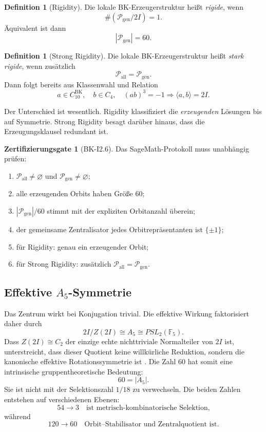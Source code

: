 \documentclass[11pt,a4paper]{article}
\theoremstyle{definition}
\newtheorem{definition}[satz]{Definition}
\newtheorem{gate}[satz]{Zertifizierungsgate}
\newcommand{\twoI}{2I}
\newcommand{\Pgen}{\mathcal P_{\mathrm{gen}}}
\newcommand{\Pall}{\mathcal P_{\mathrm{all}}}
\begin{document}
\begin{definition}[Rigidity]
Die lokale BK-Erzeugerstruktur heißt \emph{rigide}, wenn
\[
\#(\Pgen/\twoI)=1.
\]
Äquivalent ist dann
\[
|\Pgen|=60.
\]
\end{definition}

\begin{definition}[Strong Rigidity]
Die lokale BK-Erzeugerstruktur heißt \emph{stark rigide}, wenn zusätzlich
\[
\Pall=\Pgen.
\]
Dann folgt bereits aus Klassenwahl und Relation
\[
a\in C_{10}^{\mathrm{BK}},\quad
b\in C_4,\quad
(ab)^3=-1
\Longrightarrow
\langle a,b\rangle=\twoI.
\]
\end{definition}

Der Unterschied ist wesentlich. Rigidity klassifiziert die \emph{erzeugenden} Lösungen bis auf Symmetrie. Strong Rigidity besagt darüber hinaus, dass die Erzeugungsklausel redundant ist.

\begin{gate}[BK-I2.6]
Das SageMath-Protokoll muss unabhängig prüfen:
\begin{enumerate}
\item \(\Pall\neq\varnothing\) und \(\Pgen\neq\varnothing\);
\item alle erzeugenden Orbits haben Größe \(60\);
\item \(|\Pgen|/60\) stimmt mit der expliziten Orbitanzahl überein;
\item der gemeinsame Zentralisator jedes Orbitrepräsentanten ist \(\{\pm1\}\);
\item für Rigidity: genau ein erzeugender Orbit;
\item für Strong Rigidity: zusätzlich \(\Pall=\Pgen\).
\end{enumerate}
\end{gate}

\subsection{Effektive \(A_5\)-Symmetrie}

Das Zentrum wirkt bei Konjugation trivial. Die effektive Wirkung faktorisiert daher durch
\[
\twoI/Z(\twoI)\cong A_5\cong PSL_2(\mathbb F_5).
\]
Dass $Z(2I)\cong C_2$ der einzige echte nichttriviale Normalteiler von $2I$ ist, unterstreicht, dass dieser Quotient keine willkürliche Reduktion, sondern die kanonische effektive Rotationssymmetrie ist \cite{nLab2I}.
Die Zahl \(60\) hat somit eine intrinsische gruppentheoretische Bedeutung:
\[
60=|A_5|.
\]
Sie ist nicht mit der Selektionszahl \(1/18\) zu verwechseln. Die beiden Zahlen entstehen auf verschiedenen Ebenen:
\[
54\to3\quad\text{ist metrisch-kombinatorische Selektion,}
\]
während
\[
120\to60\quad\text{Orbit--Stabilisator und Zentralquotient ist.}
\]
\end{document}
